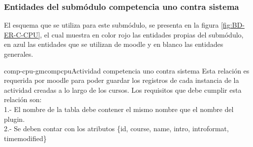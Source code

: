 \clearpage
    \subsubsection{Entidades del submódulo competencia uno contra sistema}
 
        El esquema que se utiliza para este submódulo, se presenta en la figura 
        \ref{fig:BD-ER-C-CPU}, el cual muestra en color rojo las entidades propias del submódulo, 
        en azul las entidades que se utilizan de moodle  y en blanco las entidades generales.



        \begin{cdtEntidad}{comp-cpu-gmcompcpu}{Actividad competencia uno contra sistema}{
        Esta relación es requerida por moodle para poder guardar los registros de cada instancia de la actividad creadas a lo largo de los cursos. Los requisitos que debe cumplir esta relación son:\\
            1.- El nombre de la tabla debe contener el mismo nombre que el nombre del plugin.\\
            2.- Se deben contar con los atributos \{id, course, name, intro, introformat, timemodified\}}



\end{cdtEntidad}

